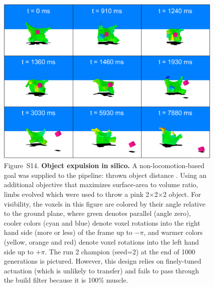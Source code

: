 \begin{figure}[t]
\centering
\includegraphics[width=\linewidth]{Chapter07/img/catapult.png}
\caption*{Figure~S14.  \textbf{Object expulsion in silico.} 
A non-locomotion-based goal was supplied to the pipeline: thrown object distance \cite{chaumont2007evolving}. 
Using an additional objective that maximizes surface-area to volume ratio, limbs evolved which were used to throw a pink 2{$\times$}2{$\times$}2 object. 
For visibility, the voxels in this figure are colored by their angle relative to the ground plane, where green denotes parallel (angle zero), cooler colors (cyan and blue) denote voxel rotations into the right hand side (more or less) of the frame up to {$-\pi$}, and warmer colors (yellow, orange and red) denote voxel rotations into the left hand side up to {$+\pi$}. 
The run 2 champion (seed=2) at the end of 1000 generations is pictured. However, this design relies on finely-tuned actuation (which is unlikely to transfer) and fails to pass through the build filter because it is 100\% muscle. 
}
\end{figure}



